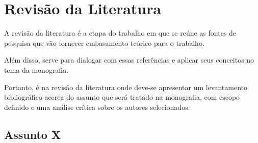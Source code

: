 \chapter{Revisão da Literatura}
A revisão da literatura é a etapa do trabalho em que se reúne as fontes de pesquisa que vão fornecer embasamento teórico para o trabalho.

Além disso, serve para dialogar com essas referências e aplicar seus conceitos no tema da monografia.

Portanto, é na revisão da literatura onde deve-se apresentar um levantamento bibliográfico acerca do assunto que será tratado na monografia, com escopo definido e uma análise crítica sobre os autores selecionados. 



\section{Assunto X}

